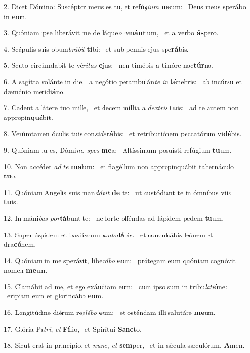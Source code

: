 2. Dicet Dómino: Suscéptor meus es tu, et refú\textit{gi}\textit{um} \textbf{me}um: \ast\  Deus meus sperábo in \textbf{e}um.\

3. Quóniam ipse liberávit me de láque\textit{o} \textit{ve}\textbf{nán}tium, \ast\  et a verbo \textbf{ás}pero.\

4. Scápulis suis obum\textit{brá}\textit{bit} \textbf{ti}bi: \ast\  et sub pennis ejus spe\textbf{rá}bis.\

5. Scuto circúmdabit te vé\textit{ri}\textit{tas} \textbf{e}jus: \ast\  non timébis a timóre noc\textbf{túr}no.\

6. A sagítta volánte in die, \dag\  a negótio perambulán\textit{te} \textit{in} \textbf{té}nebris: \ast\  ab incúrsu et dæmónio meridi\textbf{á}no.\

7. Cadent a látere tuo mille, \dag\  et decem míllia a \textit{dex}\textit{tris} \textbf{tu}is: \ast\  ad te autem non appropin\textbf{quá}bit.\

8. Verúmtamen óculis tuis con\textit{si}\textit{de}\textbf{rá}bis: \ast\  et retributiónem peccatórum vi\textbf{dé}bis.\

9. Quóniam tu es, Dómi\textit{ne}, \textit{spes} \textbf{me}a: \ast\  Altíssimum posuísti refúgium \textbf{tu}um.\

10. Non accédet \textit{ad} \textit{te} \textbf{ma}lum: \ast\  et flagéllum non appropinquábit tabernáculo \textbf{tu}o.\

11. Quóniam Angelis suis man\textit{dá}\textit{vit} \textbf{de} te: \ast\  ut custódiant te in ómnibus viis \textbf{tu}is.\

12. In máni\textit{bus} \textit{por}\textbf{tá}bunt te: \ast\  ne forte offéndas ad lápidem pedem \textbf{tu}um.\

13. Super áspidem et basilíscum \textit{am}\textit{bu}\textbf{lá}bis: \ast\  et conculcábis leónem et dra\textbf{có}nem.\

14. Quóniam in me sperávit, libe\textit{rá}\textit{bo} \textbf{e}um: \ast\  prótegam eum quóniam cognóvit nomen \textbf{me}um.\

15. Clamábit ad me, et ego exáudiam eum: \dag\  cum ipso sum in tribu\textit{la}\textit{ti}\textbf{ó}ne: \ast\  erípiam eum et glorificábo \textbf{e}um.\

16. Longitúdine diérum re\textit{plé}\textit{bo} \textbf{e}um: \ast\  et osténdam illi salutáre \textbf{me}um.\

17. Glória Pa\textit{tri}, \textit{et} \textbf{Fí}lio, \ast\  et Spirítui \textbf{Sanc}to.\

18. Sicut erat in princípio, et \textit{nunc}, \textit{et} \textbf{sem}per, \ast\  et in sǽcula sæculórum. \textbf{A}men.\

